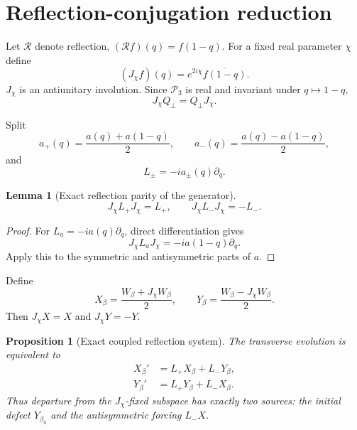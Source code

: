 \documentclass[11pt]{amsart}
\numberwithin{equation}{section}
\theoremstyle{plain}
\newtheorem{proposition}[theorem]{Proposition}
\newtheorem{lemma}[theorem]{Lemma}
\theoremstyle{definition}
\theoremstyle{remark}
\newcommand{\Pcal}{\mathcal P}
\begin{document}
\section{Reflection-conjugation reduction}
\label{sec:reflection}

Let $\mathcal R$ denote reflection, $(\mathcal R f)(q)=f(1-q)$.  For a fixed real parameter $\chi$ define
\begin{equation}
\boxed{
(J_\chi f)(q)=e^{2i\chi}\overline{f(1-q)}.
}
\label{eq:J}
\end{equation}
$J_\chi$ is an antiunitary involution.  Since $\Pcal_3$ is real and invariant under $q\mapsto1-q$,
\begin{equation}
\boxed{J_\chi Q_\perp=Q_\perp J_\chi.}
\label{eq:JQ}
\end{equation}

Split
\begin{equation}
a_+(q)=\frac{a(q)+a(1-q)}2,
\qquad
a_-(q)=\frac{a(q)-a(1-q)}2,
\end{equation}
and
\begin{equation}
L_\pm=-ia_\pm(q)\partial_q.
\end{equation}

\begin{lemma}[Exact reflection parity of the generator]
\label{lem:JL}
\begin{equation}
\boxed{
J_\chi L_+J_\chi=L_+,
\qquad
J_\chi L_-J_\chi=-L_-.
}
\label{eq:JL}
\end{equation}
\end{lemma}

\begin{proof}
For $L_a=-ia(q)\partial_q$, direct differentiation gives
\begin{equation}
J_\chi L_aJ_\chi=-ia(1-q)\partial_q.
\end{equation}
Apply this to the symmetric and antisymmetric parts of $a$.
\end{proof}

Define
\begin{equation}
X_\beta=\frac{W_\beta+J_\chi W_\beta}{2},
\qquad
Y_\beta=\frac{W_\beta-J_\chi W_\beta}{2}.
\label{eq:XY}
\end{equation}
Then $J_\chi X=X$ and $J_\chi Y=-Y$.

\begin{proposition}[Exact coupled reflection system]
\label{prop:XYflow}
The transverse evolution is equivalent to
\begin{equation}
\boxed{
\begin{aligned}
X_\beta'&=L_+X_\beta+L_-Y_\beta,\\
Y_\beta'&=L_+Y_\beta+L_-X_\beta.
\end{aligned}}
\label{eq:XYflow}
\end{equation}
Thus departure from the $J_\chi$-fixed subspace has exactly two sources: the initial defect $Y_{\beta_0}$ and the antisymmetric forcing $L_-X$.
\end{proposition}
\end{document}
